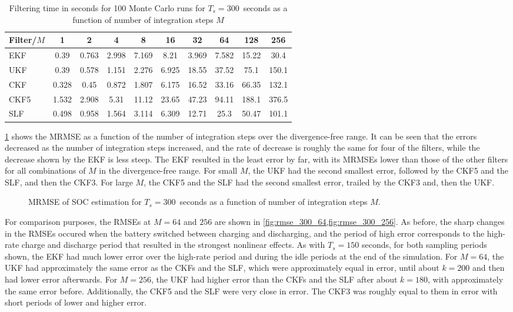 \documentclass[../zhang_thesis.tex]{subfiles}
\begin{document}
\begin{table}[h]
\centering
\caption{Filtering time in seconds for 100 Monte Carlo runs for $T_s=300$~seconds as a function of number of integration steps $M$}
\begin{tabular}{@{}lccccccccc@{}}
\toprule
Filter/$M$ & 1     & 2     & 4     & 8     & 16    & 32    & 64    & 128   & 256   \\ \midrule
EKF        & 0.39  & 0.763 & 2.998 & 7.169 & 8.21  & 3.969 & 7.582 & 15.22 & 30.4  \\
UKF        & 0.39  & 0.578 & 1.151 & 2.276 & 6.925 & 18.55 & 37.52 & 75.1  & 150.1 \\
CKF        & 0.328 & 0.45  & 0.872 & 1.807 & 6.175 & 16.52 & 33.16 & 66.35 & 132.1 \\
CKF5       & 1.532 & 2.908 & 5.31  & 11.12 & 23.65 & 47.23 & 94.11 & 188.1 & 376.5 \\
SLF        & 0.498 & 0.958 & 1.564 & 3.114 & 6.309 & 12.71 & 25.3  & 50.47 & 101.1 \\ \bottomrule
\end{tabular}
\label{tab:time_300}
\end{table}

\cref{fig:mrmse_300} shows the MRMSE as a function of the number of integration steps over the divergence-free range. It can be seen that the errors decreased as the number of integration steps increased, and the rate of decrease is roughly the same for four of the filters, while the decrease shown by the EKF is less steep. The EKF resulted in the least error by far, with its MRMSEs lower than those of the other filters for all combinations of $M$ in the divergence-free range. For small
$M$, the UKF had the second smallest error, followed by the CKF5 and the SLF, and then the CKF3. For large $M$, the CKF5 and the SLF had the second smallest error, trailed by the CKF3 and, then the UKF.

\begin{figure}[ht]
\centering
%
\caption{MRMSE of SOC estimation for $T_s=300$~seconds as a function of number of integration steps $M$.}
\label{fig:mrmse_300}
\end{figure}

For comparison purposes, the RMSEs at $M=64$ and $256$ are shown in \cref{fig:rmse_300_64,fig:rmse_300_256}. As before, the sharp changes in the RMSEs occured when the battery switched between charging and discharging, and the period of high error corresponds to the high-rate charge and discharge period that resulted in the strongest nonlinear effects. As with $T_s=150$ seconds, for both sampling periods shown, the EKF had much lower error over the high-rate period and during the idle periods at the end of the simulation. For $M=64$, the UKF had approximately the same error as the CKFs
and the SLF, which were approximately equal in error, until about $k=200$ and then had lower error afterwards. For $M=256$, the UKF had higher error than the CKFs and the SLF after about $k=180$, with approximately the same error before. Additionally, the CKF5 and the SLF were very close in error. The CKF3 was roughly equal to them in error with short periods of lower and higher error.
\end{document}
